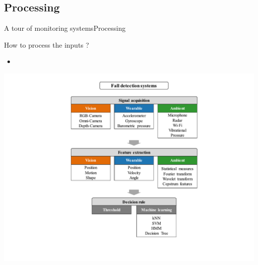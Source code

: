 \documentclass[9pt,t,aspectratio=1610]{beamer}
\begin{document}
\subsection{Processing}
\begin{frame}{A tour of monitoring systems}{Processing}

    \begin{minipage}[c]{0.49\linewidth}
    How to process the inputs ?
    \begin{itemize}
        \item 
    \end{itemize}

    \end{minipage}\hfill
    \begin{minipage}[c]{0.49\linewidth}
        \begin{overprint}
            \includegraphics[width=\linewidth, trim={190 50 150 60}, clip]{fall_systems_3-14.pdf}
        \end{overprint}
    \end{minipage}
\end{frame}
\end{document}
